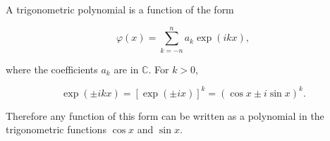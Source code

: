 A trigonometric polynomial is a function of the form

$$\varphi(x) = \sum_{k=-n}^{n} a_k \exp(ikx),$$

where the coefficients $a_k$ are in $\mathbb{C}$. For $k > 0$,

$$\exp(\pm ikx) = [\exp(\pm ix)]^k = (\cos x \pm i \sin x)^k.$$

Therefore any function of this form can be written as a polynomial in the trigonometric functions $\cos x$ and $\sin x$.

